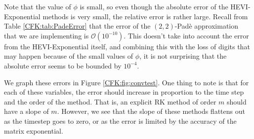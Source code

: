 \documentclass{csri19}
\begin{document}
Note that the value of $\phi$ is small, so even though the absolute error 
of the HEVI-Exponential methods is very small, the relative error is rather
 large. Recall from Table \ref{CFK:tab:PadeError} that the error of the 
$(2,2)$-Pad\`e approximation that we are implementing is $\mathcal{O}(10^{-10})$.
This doesn't take into account the error from the HEVI-Exponential itself, 
and combining this with the loss of digits that may happen because of the 
small values of $\phi$, it is not surprising that the absolute error seems
to be bounded by $10^{-4}$.

We graph these errors in Figure \ref{CFK:fig:convtest}. One thing to note
is that for each of these variables, the error should increase in 
proportion to the time step and the order of the method. That is, an 
explicit RK method of order $m$ should have a slope of $m$. However, we 
see that the slope of these methods flattens out as the timestep goes to 
zero, or as the error is limited by the accuracy of the matrix exponential.
\end{document}

